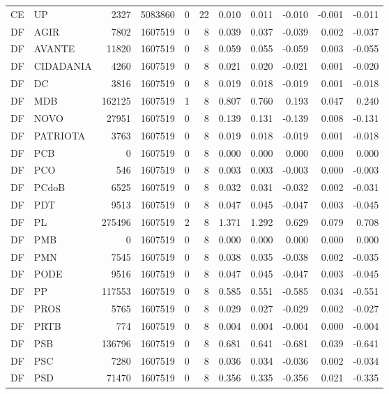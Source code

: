 \begin{landscape}
\begin{longtable}{llrrrrrrrrr}
CE & UP & 2327 & 5083860 & 0 & 22 & 0.010 & 0.011 & -0.010 & -0.001 & -0.011 \\
DF & AGIR & 7802 & 1607519 & 0 & 8 & 0.039 & 0.037 & -0.039 & 0.002 & -0.037 \\
DF & AVANTE & 11820 & 1607519 & 0 & 8 & 0.059 & 0.055 & -0.059 & 0.003 & -0.055 \\
DF & CIDADANIA & 4260 & 1607519 & 0 & 8 & 0.021 & 0.020 & -0.021 & 0.001 & -0.020 \\
DF & DC & 3816 & 1607519 & 0 & 8 & 0.019 & 0.018 & -0.019 & 0.001 & -0.018 \\
DF & MDB & 162125 & 1607519 & 1 & 8 & 0.807 & 0.760 & 0.193 & 0.047 & 0.240 \\
DF & NOVO & 27951 & 1607519 & 0 & 8 & 0.139 & 0.131 & -0.139 & 0.008 & -0.131 \\
DF & PATRIOTA & 3763 & 1607519 & 0 & 8 & 0.019 & 0.018 & -0.019 & 0.001 & -0.018 \\
DF & PCB & 0 & 1607519 & 0 & 8 & 0.000 & 0.000 & 0.000 & 0.000 & 0.000 \\
DF & PCO & 546 & 1607519 & 0 & 8 & 0.003 & 0.003 & -0.003 & 0.000 & -0.003 \\
DF & PCdoB & 6525 & 1607519 & 0 & 8 & 0.032 & 0.031 & -0.032 & 0.002 & -0.031 \\
DF & PDT & 9513 & 1607519 & 0 & 8 & 0.047 & 0.045 & -0.047 & 0.003 & -0.045 \\
DF & PL & 275496 & 1607519 & 2 & 8 & 1.371 & 1.292 & 0.629 & 0.079 & 0.708 \\
DF & PMB & 0 & 1607519 & 0 & 8 & 0.000 & 0.000 & 0.000 & 0.000 & 0.000 \\
DF & PMN & 7545 & 1607519 & 0 & 8 & 0.038 & 0.035 & -0.038 & 0.002 & -0.035 \\
DF & PODE & 9516 & 1607519 & 0 & 8 & 0.047 & 0.045 & -0.047 & 0.003 & -0.045 \\
DF & PP & 117553 & 1607519 & 0 & 8 & 0.585 & 0.551 & -0.585 & 0.034 & -0.551 \\
DF & PROS & 5765 & 1607519 & 0 & 8 & 0.029 & 0.027 & -0.029 & 0.002 & -0.027 \\
DF & PRTB & 774 & 1607519 & 0 & 8 & 0.004 & 0.004 & -0.004 & 0.000 & -0.004 \\
DF & PSB & 136796 & 1607519 & 0 & 8 & 0.681 & 0.641 & -0.681 & 0.039 & -0.641 \\
DF & PSC & 7280 & 1607519 & 0 & 8 & 0.036 & 0.034 & -0.036 & 0.002 & -0.034 \\
DF & PSD & 71470 & 1607519 & 0 & 8 & 0.356 & 0.335 & -0.356 & 0.021 & -0.335 \\

\end{longtable}
\end{landscape}
